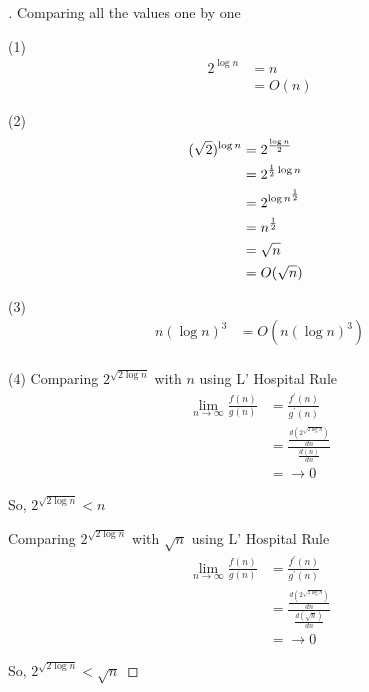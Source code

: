 \documentclass[a4paper, 12pt]{article}
\begin{document}
\begin{proof}[\color{red}{Solution}]
Comparing all the values one by one
\smallskip

(1) \hspace{1em} 
\begin{align*}
    2^{\log n} &= n \\
    &= O(n)
\end{align*}

(2) \hspace{1em} 
\begin{align*}
    (\sqrt{2})^{\log n} &= 2^{\frac{\log n}{2}} \\
    &= 2^{\frac{1}{2} \log n} \\
    &= 2^{\log n^\frac{1}{2}} && \text{\footnotesize } \\
    &= n^{\frac{1}{2}} \\
    &= \sqrt{n} \\
    &= O(\sqrt{n})
\end{align*}

(3) \hspace{1em} 
\begin{align*}
    n (\log n)^3 &= O(n (\log n)^3) \\
\end{align*}

(4) \hspace{1em} 
Comparing $2^{\sqrt{2 \log n}}$ with $n$ using L' Hospital Rule
\begin{align*}
    \lim_{n \to \infty} \frac{f(n)}{g(n)} &= \frac{f^{'}(n)}{g^{'}(n)} \\
    &= \frac{\frac{d(2^{\sqrt{2 \log n}})}{d n}}{\frac{d(n)}{d n}} \\
    &= \to 0
\end{align*}

\hspace{4em} So, $2^{\sqrt{2 \log n}} < n$

\hspace{4em} Comparing $2^{\sqrt{2 \log n}}$ with $\sqrt{n}$ using L' Hospital Rule
\begin{align*}
    \lim_{n \to \infty} \frac{f(n)}{g(n)} &= \frac{f^{'}(n)}{g^{'}(n)} \\
    &= \frac{\frac{d(2^{\sqrt{2 \log n}})}{d n}}{\frac{d(\sqrt{n})}{d n}} \\
    &= \to 0
\end{align*}

\hspace{4em} So, $2^{\sqrt{2 \log n}} < \sqrt{n}$


\end{proof}
\end{document}
